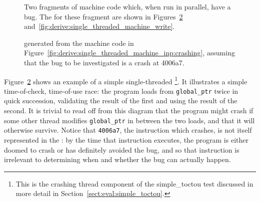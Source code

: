 \begin{figure}
  \caption{Two fragments of machine code which, when run in parallel,
    have a bug.  The {\StateMachines} for these fragment are shown in
    Figures~\ref{fig:derive:single_threaded_machine}
    and~\ref{fig:derive:single_threaded_machine_write}.}
  \label{fig:derive:single_threaded_machine_inp}
\end{figure}

\begin{figure}
  \begin{center}
    
  \end{center}
  \caption{{\StateMachine} generated from the machine code in
    Figure~\ref{fig:derive:single_threaded_machine_inp:crashing},
    assuming that the bug to be investigated is a crash at
    4006a7.}
  \label{fig:derive:single_threaded_machine}
\end{figure}

Figure~\ref{fig:derive:single_threaded_machine} shows an example of a
simple single-threaded {\StateMachine}\footnote{This is the crashing
  thread component of the simple\_toctou test discussed in more detail
  in Section~\ref{sect:eval:simple_toctou}.}.  It illustrates a simple
time-of-check, time-of-use race: the program loads from
\verb|global_ptr| twice in quick succession, validating the result of
the first and using the result of the second.  It is trivial to read
off from this diagram that the program might crash if some other
thread modifies \verb|global_ptr| in between the two loads, and that
it will otherwise survive.  Notice that \verb|4006a7|, the instruction
which crashes, is not itself represented in the {\StateMachine}: by
the time that instruction executes, the program is either doomed to
crash or has definitely avoided the bug, and so that instruction is
irrelevant to determining when and whether the bug can actually
happen.

